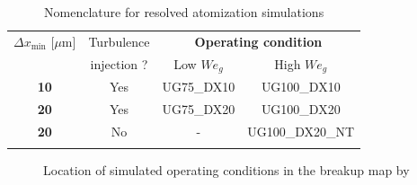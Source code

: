 
\begin{table}[!h]
\centering
\caption{Nomenclature for resolved atomization simulations}
\begin{tabular}{cccc}
\thickhline
$\Delta x_\mathrm{min}$ [$\mu$m]  & Turbulence & \multicolumn{2}{c}{\textbf{Operating condition}} \\ 
\cline{3-4}
 & injection ? & Low $We_g$ &  High $We_g$ \\ 
\thickhline
\textbf{10} & Yes & UG75\_DX10 & UG100\_DX10 \\
\textbf{20} & Yes & UG75\_DX20 & UG100\_DX20 \\
\textbf{20} & No & - & UG100\_DX20\_NT \\
\thickhline
\end{tabular}
\label{tab:jicf_resolved_simulations_performed}
\end{table}


\begin{figure}[ht]
     \centering
     \caption{Location of simulated operating conditions in the breakup map by \citeColor[wu_breakup_1997]}
      \label{fig:location_JICF_ops_in_breakup_map}
\end{figure}




